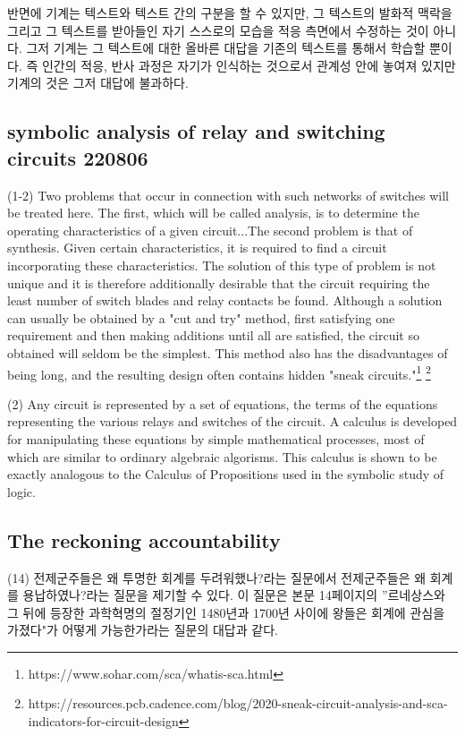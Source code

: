 \documentclass[11pt, a4paper]{article}
\begin{document}
반면에 기계는 텍스트와 텍스트 간의 구분을 할 수 있지만, 그 텍스트의 발화적 맥락을 그리고 그 텍스트를 받아들인 자기 스스로의 모습을 적응 측면에서 수정하는 것이 아니다. 그저 기계는 그 텍스트에 대한 올바른 대답을 기존의 텍스트를 통해서 학습할 뿐이다. 즉 인간의 적응, 반사 과정은 자기가 인식하는 것으로서 관계성 안에 놓여져 있지만 기계의 것은 그저 대답에 불과하다. 

\newpage
\subsection{symbolic analysis of relay and switching circuits 220806}

(1-2) Two problems that occur in connection with such networks of switches will be treated here. The first, which will be called
analysis, is to determine the operating characteristics
of a given circuit...The second problem is that of synthesis. Given certain characteristics, it is required to find a circuit incorporating these characteristics. The solution of this type of problem is not unique and it is therefore additionally desirable that the circuit requiring the least number of switch blades and relay contacts be found. Although a solution can usually be
obtained by a "cut and try" method, first satisfying
one requirement and then making additions until all
are satisfied, the circuit so obtained will seldom
be the simplest. This method also has the disadvantages
of being long, and the resulting design often
contains hidden "sneak circuits."\footnote{https://www.sohar.com/sca/whatis-sca.html} \footnote{https://resources.pcb.cadence.com/blog/2020-sneak-circuit-analysis-and-sca-indicators-for-circuit-design}

(2) Any circuit is represented by a set of equations,
the terms of the equations representing the
various relays and switches of the circuit. A calculus
is developed for manipulating these equations
by simple mathematical processes, most of which are
similar to ordinary algebraic algorisms. This calculus
is shown to be exactly analogous to the Calculus
of Propositions used in the symbolic study of
logic. \\

\newpage

\subsection{The reckoning accountability}

(14) 전제군주들은 왜 투명한 회계를 두려워했나?라는 질문에서 전제군주들은 왜 회계를 용납하였나?라는 질문을 제기할 수 있다. 이 질문은 본문 14페이지의 ''르네상스와 그 뒤에 등장한 과학혁명의 절정기인 1480년과 1700년 사이에 왕들은 회계에 관심을 가졌다"가 어떻게 가능한가라는 질문의 대답과 같다. \\
\end{document}
